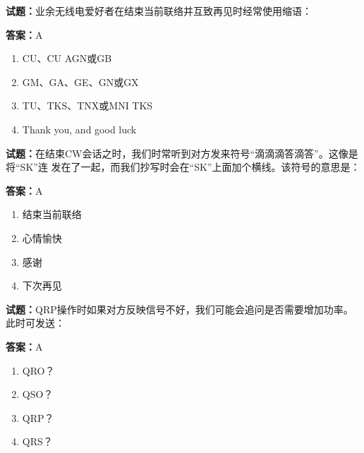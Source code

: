 \documentclass{ctexbook}
\begin{document}




\vspace{1em}

\textbf{试题：}业余无线电爱好者在结束当前联络并互致再见时经常使用缩语： 

\textbf{答案：}A 

\begin{enumerate}[leftmargin=3em]
  \item CU、CU AGN或GB 

  \item GM、GA、GE、GN或GX 

  \item TU、TKS、TNX或MNI TKS 

  \item Thank you, and good luck 

\end{enumerate}





\vspace{1em}

\textbf{试题：}在结束CW会话之时，我们时常听到对方发来符号“滴滴滴答滴答”。这像是将“SK”连
发在了一起，而我们抄写时会在“SK”上面加个横线。该符号的意思是： 

\textbf{答案：}A 

\begin{enumerate}[leftmargin=3em]
  \item 结束当前联络 

  \item 心情愉快 

  \item 感谢 

  \item 下次再见 

\end{enumerate}





\vspace{1em}

\textbf{试题：}QRP操作时如果对方反映信号不好，我们可能会追问是否需要增加功率。此时可发送： 

\textbf{答案：}A 

\begin{enumerate}[leftmargin=3em]
  \item QRO？ 

  \item QSO？ 

  \item QRP？ 

  \item QRS？ 

\end{enumerate}
\end{document}
